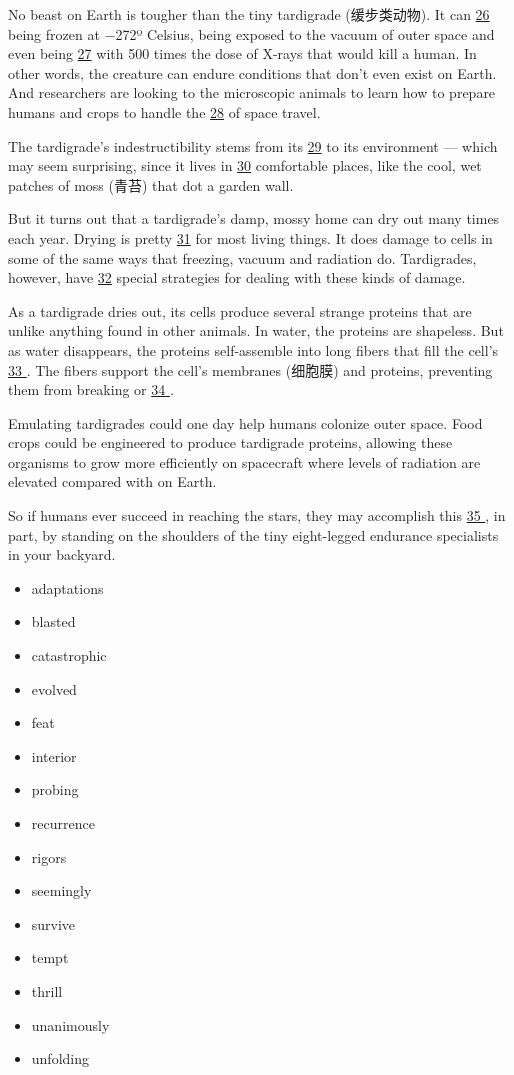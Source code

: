 \documentclass[UTF8,11pt]{ctexart}
\begin{document}
No beast on Earth is tougher than the tiny tardigrade (缓步类动物). It can \uline{26} being frozen at −272º Celsius, being exposed to the vacuum of outer space and even being \uline{27} with 500 times the dose of X-rays that would kill a human. In other words, the creature can endure conditions that don’t even exist on Earth. And researchers are looking to the microscopic animals to learn how to prepare humans and crops to handle the \uline{28} of space travel.


The tardigrade’s indestructibility stems from its \uline{29} to its environment — which may seem surprising, since it lives in \uline{30} comfortable places, like the cool, wet patches of moss (青苔) that dot a garden wall.


But it turns out that a tardigrade’s damp, mossy home can dry out many times each year. Drying is pretty \uline{31} for most living things. It does damage to cells in some of the same ways that freezing, vacuum and radiation do. Tardigrades, however, have \uline{32} special strategies for dealing with these kinds of damage.


As a tardigrade dries out, its cells produce several strange proteins that are unlike anything found in other animals. In water, the proteins are shapeless. But as water disappears, the proteins self-assemble into long fibers that fill the cell’s \uline{33 }. The fibers support the cell’s membranes (细胞膜) and proteins, preventing them from breaking or \uline{34 }.


Emulating tardigrades could one day help humans colonize outer space. Food crops could be engineered to produce tardigrade proteins, allowing these organisms to grow more efficiently on spacecraft where levels of radiation are elevated compared with on Earth.


So if humans ever succeed in reaching the stars, they may accomplish this \uline{35 }, in part, by standing on the shoulders of the tiny eight-legged endurance specialists in your backyard.


\begin{itemize}[leftmargin=2em,itemsep=.2em,topsep=.4em]\item[A.] adaptations
\item[B.] blasted
\item[C.] catastrophic
\item[D.] evolved
\item[E.] feat
\item[F.] interior
\item[G.] probing
\item[H.] recurrence
\item[I.] rigors
\item[J.] seemingly
\item[K.] survive
\item[L.] tempt
\item[M.] thrill
\item[N.] unanimously
\item[O.] unfolding
\end{itemize}
\end{document}
